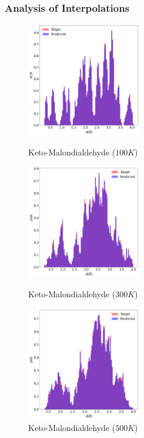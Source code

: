 \documentclass[usenames, dvipsnames, t]{beamer}
\begin{document}
\begin{frame}
	\frametitle{Analysis of Interpolations}
	\begin{figure}[htb]
		\begin{minipage}{0.3\textwidth}
			\includegraphics[width=0.9\linewidth, height=5cm]{KetoMalonaldehyde100K_BiLSTM.png} 
			\caption{Keto-Malondialdehyde ($100K$)}
		\end{minipage}
		\begin{minipage}{0.3\textwidth}
			\includegraphics[width=0.9\linewidth, height=5cm]{KetoMalonaldehyde300K_BiLSTM.png}
			\caption{Keto-Malondialdehyde ($300K$)}
		\end{minipage}
		\begin{minipage}{0.3\textwidth}
			\includegraphics[width=0.9\linewidth, height=5cm]{KetoMalonaldehyde500K_BiLSTM.png}
			\caption{Keto-Malondialdehyde ($500K$)}
		\end{minipage}
	\end{figure}
\end{frame}
\end{document}
